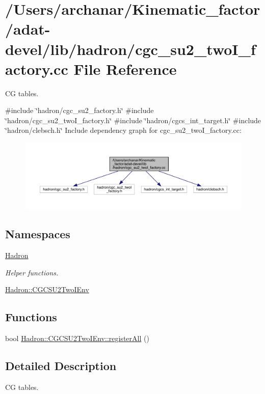 \hypertarget{adat-devel_2lib_2hadron_2cgc__su2__twoI__factory_8cc}{}\section{/\+Users/archanar/\+Kinematic\+\_\+factor/adat-\/devel/lib/hadron/cgc\+\_\+su2\+\_\+two\+I\+\_\+factory.cc File Reference}
\label{adat-devel_2lib_2hadron_2cgc__su2__twoI__factory_8cc}


CG tables.  


{\ttfamily \#include \char`\"{}hadron/cgc\+\_\+su2\+\_\+factory.\+h\char`\"{}}\newline
{\ttfamily \#include \char`\"{}hadron/cgc\+\_\+su2\+\_\+two\+I\+\_\+factory.\+h\char`\"{}}\newline
{\ttfamily \#include \char`\"{}hadron/cgcs\+\_\+int\+\_\+target.\+h\char`\"{}}\newline
{\ttfamily \#include \char`\"{}hadron/clebsch.\+h\char`\"{}}\newline
Include dependency graph for cgc\+\_\+su2\+\_\+two\+I\+\_\+factory.\+cc\+:
\nopagebreak
\begin{figure}[H]
\begin{center}
\leavevmode
\includegraphics[width=350pt]{dd/daa/adat-devel_2lib_2hadron_2cgc__su2__twoI__factory_8cc__incl}
\end{center}
\end{figure}
\subsection*{Namespaces}
\begin{DoxyCompactItemize}
\item 
 \mbox{\hyperlink{namespaceHadron}{Hadron}}
\begin{DoxyCompactList}\small\item\em Helper functions. \end{DoxyCompactList}\item 
 \mbox{\hyperlink{namespaceHadron_1_1CGCSU2TwoIEnv}{Hadron\+::\+C\+G\+C\+S\+U2\+Two\+I\+Env}}
\end{DoxyCompactItemize}
\subsection*{Functions}
\begin{DoxyCompactItemize}
\item 
bool \mbox{\hyperlink{namespaceHadron_1_1CGCSU2TwoIEnv_aed4e8b3bb2141bf8176b9a6be35b2406}{Hadron\+::\+C\+G\+C\+S\+U2\+Two\+I\+Env\+::register\+All}} ()
\end{DoxyCompactItemize}


\subsection{Detailed Description}
CG tables. 

